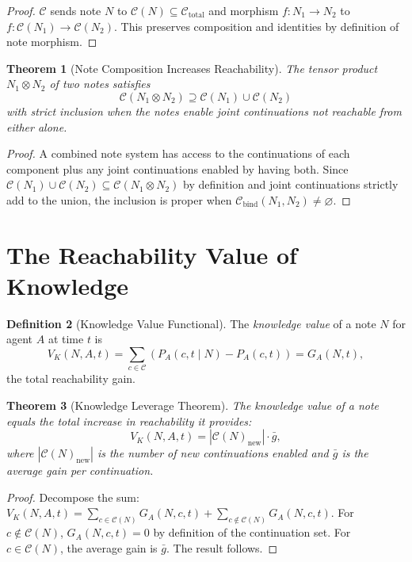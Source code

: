 \documentclass[12pt, a4paper, openany]{book}
\theoremstyle{plain}
\newtheorem{theorem}{Theorem}[chapter]
\theoremstyle{definition}
\newtheorem{definition}[theorem]{Definition}
\theoremstyle{remark}
\newcommand{\calC}{\mathcal{C}}
\begin{document}
\begin{proof}
$\calC$ sends note $N$ to $\calC(N) \subseteq \calC_{\mathrm{total}}$ and
morphism $f : N_1 \to N_2$ to $f : \calC(N_1) \to \calC(N_2)$. This preserves
composition and identities by definition of note morphism.
\end{proof}

\begin{theorem}[Note Composition Increases Reachability]
The tensor product $N_1 \otimes N_2$ of two notes satisfies
\[
\calC(N_1 \otimes N_2) \supseteq \calC(N_1) \cup \calC(N_2)
\]
with strict inclusion when the notes enable joint continuations not reachable
from either alone.
\end{theorem}

\begin{proof}
A combined note system has access to the continuations of each component plus
any joint continuations enabled by having both. Since $\calC(N_1) \cup \calC(N_2)
\subseteq \calC(N_1 \otimes N_2)$ by definition and joint continuations strictly
add to the union, the inclusion is proper when $\calC_{\mathrm{bind}}(N_1, N_2)
\neq \varnothing$.
\end{proof}

\section{The Reachability Value of Knowledge}

\begin{definition}[Knowledge Value Functional]
The \emph{knowledge value} of a note $N$ for agent $A$ at time $t$ is
\[
V_K(N, A, t) = \sum_{c \in \calC} (P_A(c, t \mid N) - P_A(c, t)) = G_A(N, t),
\]
the total reachability gain.
\end{definition}

\begin{theorem}[Knowledge Leverage Theorem]
The knowledge value of a note equals the total increase in reachability it
provides:
\[
V_K(N, A, t) = |\calC(N)_{\mathrm{new}}| \cdot \bar{g},
\]
where $|\calC(N)_{\mathrm{new}}|$ is the number of new continuations enabled
and $\bar{g}$ is the average gain per continuation.
\end{theorem}

\begin{proof}
Decompose the sum: $V_K(N, A, t) = \sum_{c \in \calC(N)} G_A(N, c, t) +
\sum_{c \notin \calC(N)} G_A(N, c, t)$. For $c \notin \calC(N)$, $G_A(N, c, t) = 0$
by definition of the continuation set. For $c \in \calC(N)$, the average gain
is $\bar{g}$. The result follows.
\end{proof}
\end{document}

